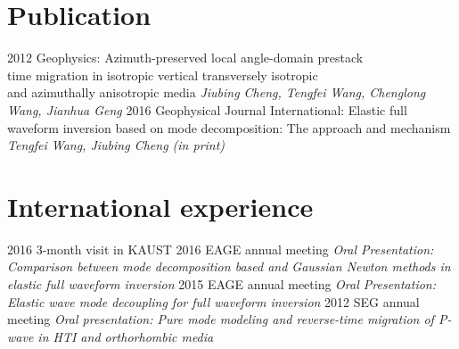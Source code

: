 \documentclass[]{friggeri-encvblackwhite}
\begin{document}
\section{Publication}
\begin{entrylist}
  \entry
    {2012}
	{Geophysics: Azimuth-preserved local angle-domain prestack \\
	time migration in isotropic	vertical transversely isotropic\\
	and azimuthally anisotropic media}
	{\emph{Jiubing Cheng, Tengfei Wang, Chenglong Wang, Jianhua Geng}}
  \entry
    {2016}
	{Geophysical Journal International: Elastic full waveform inversion based on mode
		decomposition: The approach and	mechanism 
	}
	{\emph{Tengfei Wang, Jiubing Cheng (in print)}}
\end{entrylist}

\section{International experience}
\begin{entrylist}
  \entry
    {2016}
    {3-month visit in KAUST}
	{\emph{
	}}
  \entry
    {2016}
    {EAGE annual meeting}
	{\emph{Oral Presentation: Comparison between mode decomposition based and Gaussian Newton methods in
		elastic full waveform inversion
	}}
  \entry
    {2015}
    {EAGE annual meeting}
	{\emph{Oral Presentation: 
		Elastic wave mode decoupling for full waveform inversion
	}}
  \entry
    {2012}
    {SEG annual meeting}
	{\emph{Oral presentation: Pure mode modeling and reverse-time migration of P-wave in
		HTI and orthorhombic media
	}}
\end{entrylist}
\end{document}
